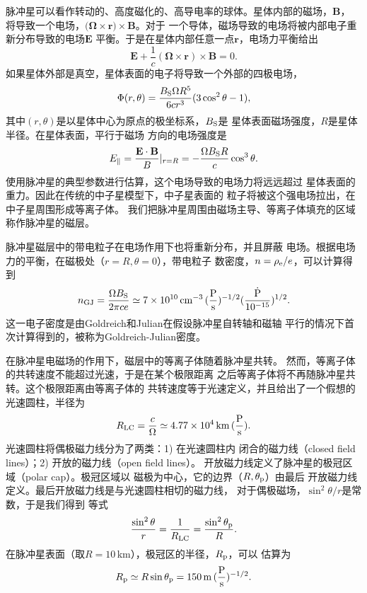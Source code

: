 脉冲星可以看作转动的、高度磁化的、高导电率的球体。星体内部的磁场，$\mathbf{B}$，
将导致一个电场，$(\mathbf{\Omega\times r)\times B}$。对于
一个导体，磁场导致的电场将被内部电子重新分布导致的电场$\mathbf{E}$
平衡。于是在星体内部任意一点$\mathbf{r}$，电场力平衡给出
\begin{equation}
\mathbf{E}+\frac{1}{c}\mathbf{(\Omega\times r)\times B}=0.
\end{equation}
如果星体外部是真空，星体表面的电子将导致一个外部的四极电场，
\begin{equation}
\Phi(r,\theta)=\frac{B_{\rm{S}}\Omega R^{5}}{6cr^{3}}(3\cos^{2}{\theta}-1),
\end{equation}
其中$(r,\theta)$是以星体中心为原点的极坐标系，$B_{\rm{S}}$是
星体表面磁场强度，$R$是星体半径。在星体表面，平行于磁场
方向的电场强度是
\begin{equation}
E_{\parallel}=\frac{\mathbf{E\cdot B}}{B}\arrowvert_{r=R}=-\frac{\Omega B_{\rm{S}}R}{c}\cos^{3}{\theta}.
\end{equation}
使用脉冲星的典型参数进行估算，这个电场导致的电场力将远远超过
星体表面的重力。因此在传统的中子星模型下，中子星表面的
粒子将被这个强电场拉出，在中子星周围形成等离子体。
我们把脉冲星周围由磁场主导、等离子体填充的区域称作脉冲星的磁层。

脉冲星磁层中的带电粒子在电场作用下也将重新分布，并且屏蔽
电场。根据电场力的平衡，在磁极处（$r=R,\theta=0$），带电粒子
数密度，$n=\rho_{\rm{e}}/e$，可以计算得到
\begin{equation}
n_{\rm{GJ}}=\frac{\Omega B_{\rm{S}}}{2\pi ce}\simeq 7\times10^{10}\,\rm{cm^{-3}}\,(\frac{P}{s})^{-1/2}(\frac{\dot{P}}{10^{-15}})^{1/2}.
\end{equation}
这一电子密度是由Goldreich和Julian在假设脉冲星自转轴和磁轴
平行的情况下首次计算得到的\supercite{gj69}，被称为Goldreich-Julian密度。

在脉冲星电磁场的作用下，磁层中的等离子体随着脉冲星共转。
然而，等离子体的共转速度不能超过光速，于是在某个极限距离
之后等离子体将不再随脉冲星共转。这个极限距离由等离子体的
共转速度等于光速定义，并且给出了一个假想的光速圆柱，半径为
\begin{equation}
R_{\rm{LC}}=\frac{c}{\Omega}\simeq 4.77\times10^{4}\,\rm{km}\,(\frac{P}{s}).
\end{equation}
光速圆柱将偶极磁力线分为了两类：1) 在光速圆柱内
闭合的磁力线（closed field lines）；2) 开放的磁力线（open field lines）。
开放磁力线定义了脉冲星的极冠区域（polar cap）。极冠区域以
磁极为中心，它的边界（$R,\theta_{\rm{p}}$）由最后
开放磁力线定义。最后开放磁力线是与光速圆柱相切的磁力线，
对于偶极磁场，$\sin^{2}{\theta}/r$是常数，于是我们得到
等式
\begin{equation}
\frac{\sin^{2}{\theta}}{r}=\frac{1}{R_{\rm{LC}}}=\frac{\sin^{2}{\theta_{\rm{p}}}}{R}.
\end{equation}
在脉冲星表面（取$R=10$\,km），极冠区的半径，$R_{\rm{p}}$，可以
估算为
\begin{equation}
R_{\rm{p}}\simeq R\sin{\theta_{\rm{p}}}=150\,\rm{m}\,(\frac{P}{s})^{-1/2}.
\end{equation}

